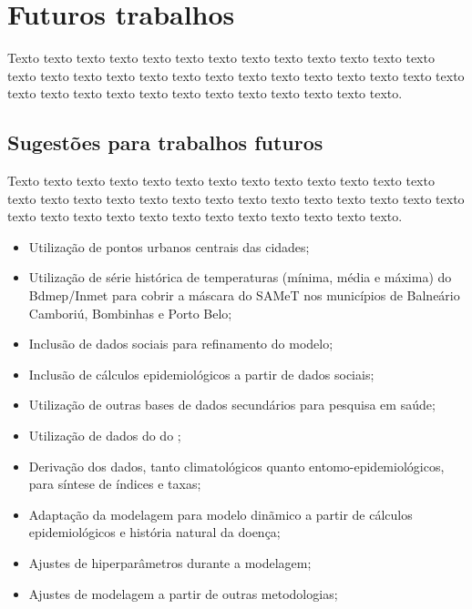 \chapter{Futuros trabalhos}

Texto texto texto texto texto texto texto texto texto texto texto texto texto texto texto texto texto texto texto texto texto texto texto texto texto texto texto texto texto texto texto texto texto texto texto texto texto texto texto.

\section{Sugestões para trabalhos futuros}

Texto texto texto texto texto texto texto texto texto texto texto texto texto texto texto texto texto texto texto texto texto texto texto texto texto texto texto texto texto texto texto texto texto texto texto texto texto texto texto.

\begin{itemize}
    \item Utilização de pontos urbanos centrais das cidades;
    \item Utilização de série histórica de temperaturas (mínima, média e máxima) do \acrfull{Bdmep/Inmet} para cobrir a máscara do \acrshort{SAMeT} nos municípios de Balneário Camboriú, Bombinhas e Porto Belo;
    \item Inclusão de dados sociais para refinamento do modelo;
    \item Inclusão de cálculos epidemiológicos a partir de dados sociais;
    \item Utilização de outras bases de dados secundários para pesquisa em saúde;
    \item Utilização de dados do  do ;
    \item Derivação dos dados, tanto climatológicos quanto entomo-epidemiológicos, para síntese de índices e taxas;
    \item Adaptação da modelagem para modelo dinãmico a partir de cálculos epidemiológicos e história natural da doença;
    \item Ajustes de hiperparâmetros durante a modelagem;
    \item Ajustes de modelagem a partir de outras metodologias;
\end{itemize}
